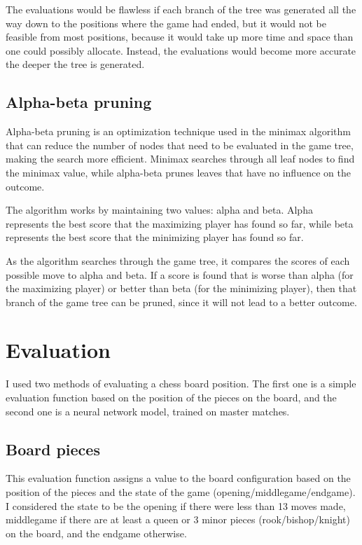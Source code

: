 The evaluations would be flawless if each branch of the tree was generated all the way down to the positions where the game had ended, but it would not be feasible from most positions, because it would take up more time and space than one could possibly allocate. Instead, the evaluations would become more accurate the deeper the tree is generated.


\subsection{Alpha-beta pruning}
\label{subsec:ch3sec2subsec2}

Alpha-beta pruning is an optimization technique used in the minimax algorithm that can reduce the number of nodes that need to be evaluated in the game tree, making the search more efficient. Minimax searches through all leaf nodes to find the minimax value, while alpha-beta prunes leaves that have no influence on the outcome.

The algorithm works by maintaining two values: alpha and beta. Alpha represents the best score that the maximizing player has found so far, while beta represents the best score that the minimizing player has found so far.

As the algorithm searches through the game tree, it compares the scores of each possible move to alpha and beta. If a score is found that is worse than alpha (for the maximizing player) or better than beta (for the minimizing player), then that branch of the game tree can be pruned, since it will not lead to a better outcome.\cite{carolus2006alpha}

\section{Evaluation}
\label{sec:ch3sec3}

I used two methods of evaluating a chess board position. The first one is a simple evaluation function based on the position of the pieces on the board, and the second one is a neural network model, trained on master matches.

\subsection{Board pieces}
\label{subsec:ch3sec3subsec1}

This evaluation function assigns a value to the board configuration based on the position of the pieces and the state of the game (opening/middlegame/endgame). I considered the state to be the opening if there were less than 13 moves made, middlegame if there are at least a queen or 3 minor pieces (rook/bishop/knight) on the board, and the endgame otherwise.

